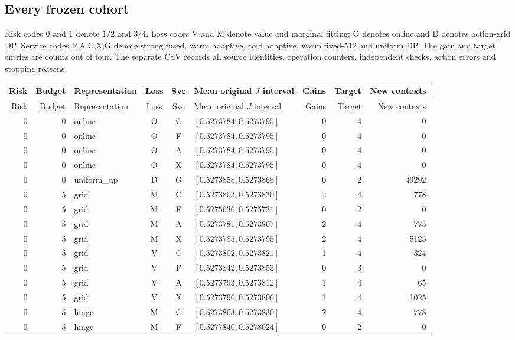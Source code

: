 \subsection{Every frozen cohort}
Risk codes 0 and 1 denote $1/2$ and $3/4$. Loss codes V and M denote value and marginal fitting; O denotes online and D denotes action-grid DP. Service codes F,A,C,X,G denote strong fused, warm adaptive, cold adaptive, warm fixed-512 and uniform DP. The gain and target entries are counts out of four. The separate CSV records all source identities, operation counters, independent checks, action errors and stopping reasons.
\begingroup\scriptsize\setlength{\tabcolsep}{3pt}
\begin{longtable}{r r l c c l r r r}
\hline
Risk & Budget & Representation & Loss & Svc & Mean original $J$ interval & Gains & Target & New contexts \\
\hline\endfirsthead
\hline Risk & Budget & Representation & Loss & Svc & Mean original $J$ interval & Gains & Target & New contexts \\ \hline\endhead
0 & 0 & online & O & C & $[0.5273784,0.5273795]$ & 0 & 4 & 0 \\
0 & 0 & online & O & F & $[0.5273784,0.5273795]$ & 0 & 4 & 0 \\
0 & 0 & online & O & A & $[0.5273784,0.5273795]$ & 0 & 4 & 0 \\
0 & 0 & online & O & X & $[0.5273784,0.5273795]$ & 0 & 4 & 0 \\
0 & 0 & uniform\_dp & D & G & $[0.5273858,0.5273868]$ & 0 & 2 & 49292 \\
0 & 5 & grid & M & C & $[0.5273803,0.5273830]$ & 2 & 4 & 778 \\
0 & 5 & grid & M & F & $[0.5275636,0.5275731]$ & 0 & 2 & 0 \\
0 & 5 & grid & M & A & $[0.5273781,0.5273807]$ & 2 & 4 & 775 \\
0 & 5 & grid & M & X & $[0.5273785,0.5273795]$ & 2 & 4 & 5125 \\
0 & 5 & grid & V & C & $[0.5273802,0.5273821]$ & 1 & 4 & 324 \\
0 & 5 & grid & V & F & $[0.5273842,0.5273853]$ & 0 & 3 & 0 \\
0 & 5 & grid & V & A & $[0.5273793,0.5273812]$ & 1 & 4 & 65 \\
0 & 5 & grid & V & X & $[0.5273796,0.5273806]$ & 1 & 4 & 1025 \\
0 & 5 & hinge & M & C & $[0.5273803,0.5273830]$ & 2 & 4 & 778 \\
0 & 5 & hinge & M & F & $[0.5277840,0.5278024]$ & 0 & 2 & 0 \\

\end{longtable}
